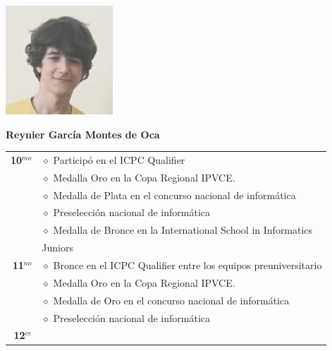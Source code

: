 \begin{minipage}{0.2\textwidth}
	\includegraphics[width=\linewidth]{img/concursantes/reynier.png} %
\end{minipage}
\hfill
\begin{minipage}{0.7\textwidth}
	\textbf{Reynier García Montes de Oca}
	
	\vspace*{0.1in}
	\begin{tabular}{rl}
		
		\textbf{10$^{mo}$} 
		& $\diamond$ Participó en el ICPC Qualifier \\
		& $\diamond$ Medalla Oro en la Copa Regional IPVCE. \\
		& $\diamond$ Medalla de Plata en el concurso nacional de informática\\
		& $\diamond$ Preselección nacional de informática  \\
		& $\diamond$ Medalla de Bronce en la International School in Informatics\\
		& Juniors \\
		
		\textbf{11$^{no}$} 
		& $\diamond$ Bronce en el ICPC Qualifier entre los equipos preuniversitario  \\
		& $\diamond$ Medalla Oro en la Copa Regional IPVCE. \\
		& $\diamond$ Medalla de Oro en el concurso nacional de informática\\
		& $\diamond$ Preselección nacional de informática  \\
		
		\textbf{12$^{ce}$} &   \\
		
		
	\end{tabular}
\end{minipage}

